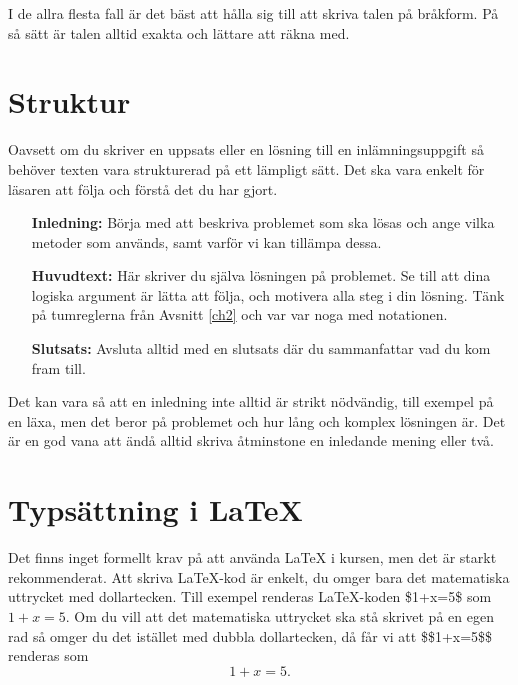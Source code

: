 \documentclass[titlepage]{article}
\begin{document}
I de allra flesta fall är det bäst att hålla sig till att skriva talen på bråkform. På så sätt är talen alltid exakta och lättare att räkna med.




\section{Struktur}

Oavsett om du skriver en uppsats eller en lösning till en inlämningsuppgift så behöver texten vara strukturerad på ett lämpligt sätt. Det ska vara enkelt för läsaren att följa och förstå det du har gjort. 

\begin{itemize}[leftmargin=25mm, rightmargin=0mm]
    \item[\textbf{Inledning:}] Börja med att beskriva problemet som ska lösas och ange vilka metoder som används, samt varför vi kan tillämpa dessa.
    \item[\textbf{Huvudtext:}] Här skriver du själva lösningen på problemet. Se till att dina logiska argument är lätta att följa, och motivera alla steg i din lösning. Tänk på tumreglerna från Avsnitt \ref{ch2} och var var noga med notationen.
    \item[\textbf{Slutsats:}] Avsluta alltid med en slutsats där du sammanfattar vad du kom fram till.
\end{itemize}

Det kan vara så att en inledning inte alltid är strikt nödvändig, till exempel på en läxa, men det beror på problemet och hur lång och komplex lösningen är. Det är en god vana att ändå alltid skriva åtminstone en inledande mening eller två.



\section{Typsättning i \LaTeX}

Det finns inget formellt krav på att använda \LaTeX$ $ i kursen, men det är starkt rekommenderat. Att skriva \LaTeX-kod är enkelt, du omger bara det matematiska uttrycket med dollartecken. Till exempel renderas \LaTeX-koden \$1+x=5\$ som $1+x=5$. Om du vill att det matematiska uttrycket ska stå skrivet på en egen rad så omger du det istället med dubbla dollartecken, då får vi att \$\$1+x=5\$\$ renderas som $$1+x=5.$$
\end{document}
